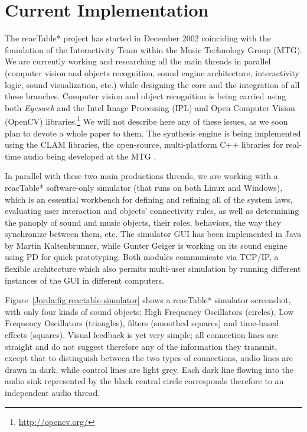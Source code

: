 \section  {Current Implementation}

The reacTable* project has started in December 2002 coinciding  with  the 
foundation  of  the  Interactivity  Team within the Music Technology Group (MTG).
We are currently working and researching all the main threads in parallel
(computer vision and objects recognition, sound engine architecture, 
interactivity  logic,  sound  visualization,  etc.) while designing the core and
the integration of all these branches. Computer vision and object recognition is
being carried using both \textit{Eyesweb} \cite{Camurri:1999,Camurri:2000} and the Intel Image Processing (IPL) and Open Computer Vision (OpenCV) libraries.\footnote{\url{http://opencv.org/}} We will
not describe here any of these issues, as we soon plan to devote a whole paper to
them. The synthesis engine is  being  implemented  using  the  CLAM libraries, 
the open-source, multi-platform C++ libraries for real-time audio being developed
at the MTG \cite{Amatriain:2002,Amatriain:2002a}.

In parallel with these two main productions  threads, we are working with a
reacTable* software-only simulator  (that runs on both Linux and Windows), which
is an essential  workbench for defining  and  refining  all  of the  system 
laws, evaluating user interaction and objects' connectivity rules, as well as
determining  the  panoply  of  sound  and  music  objects,  their roles,
behaviors, the way they synchronize between them, etc. The simulator GUI has been
 implemented  in  Java by  Martin Kaltenbrunner, while Gunter Geiger is  working 
on  its  sound engine using PD for quick prototyping. Both modules communicate
via TCP/IP, a flexible architecture which also permits multi-user simulation by 
running  different  instances of the GUI in different computers.

Figure~\ref{Jorda:fig:reactable-simulator} shows  a  reacTable*  simulator  screenshot,  with only four kinds of
sound  objects:  High Frequency Oscillators (circles), Low Frequency Oscillators
(triangles), filters (smoothed squares) and time-based effects (squares). Visual
feedback is yet very simple; all connection lines  are straight and do not
suggest therefore any of the information they transmit, except that to
distinguish between the two types of connections, audio lines are drawn in dark,
while control  lines are light grey. Each dark line  flowing  into  the  audio  sink represented by the black central circle corresponds therefore to an
independent audio thread.

